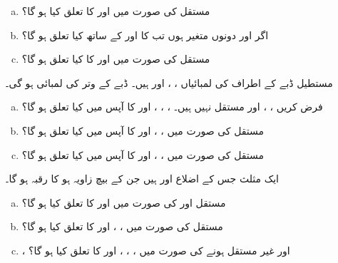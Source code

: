 \begin{enumerate}[a.]
\item
مستقل  کی صورت میں  اور  کا تعلق کیا ہو گا؟
\item
اگر  اور  دونوں متغیر ہوں تب  کا  اور  کے ساتھ کیا تعلق ہو گا؟
\item
مستقل  کی صورت میں  اور  کا کیا تعلق ہو گا؟
\end{enumerate}
مستطیل ڈبے کے اطراف کی لمبائیاں ، ،  اور  ہیں۔ ڈبے کے وتر کی لمبائی  ہو گی۔ 
\begin{enumerate}[a.]
\item
فرض کریں ، ، اور  مستقل نہیں ہیں۔ ، ، ، اور  کا آپس میں کیا تعلق ہو گا؟
\item
مستقل  کی صورت میں  ، ، اور  کا آپس میں کیا تعلق ہو گا؟
\item
مستقل  کی صورت میں  ، ، اور  کا آپس میں کیا تعلق ہو گا؟
\end{enumerate}
ایک مثلث جس کے اضلاع   اور  ہیں   جن کے بیچ زاویہ  ہو کا رقبہ  ہو گا۔
\begin{enumerate}[a.]
\item
مستقل  اور  کی صورت میں  اور  کا تعلق کیا ہو گا؟
\item
مستقل   کی صورت میں ، ، اور  کا تعلق کیا ہو گا؟
\item
{}،  اور  غیر مستقل ہونے کی صورت میں ، ، ، اور  کا تعلق کیا ہو گا؟
\end{enumerate}
